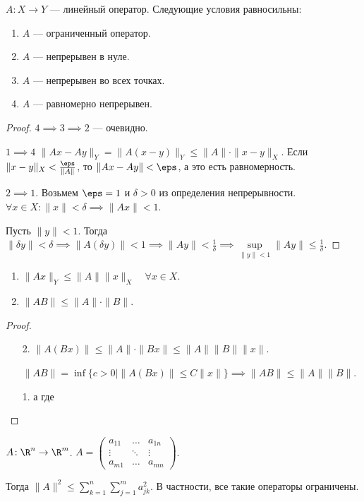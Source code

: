 \begin{theorem}
   $A\!: X \to Y$ --- линейный оператор. Следующие условия равносильны:
   \begin{enumerate}
       \item $A$ --- ограниченный оператор.
       \item  $A$ --- непрерывен в нуле.
       \item  $A$ --- непрерывен во всех точках.
       \item $A$ --- равномерно непрерывен.
   \end{enumerate}
\end{theorem}
\begin{proof}
    $4 \implies 3 \implies 2$ --- очевидно.

    $1 \implies 4$  $\|Ax - Ay\|_Y = \|A(x-y)\|_Y \le \|A\| \cdot \|x-y\|_X$. Если $\|x-y\|_X < \frac{\eps}{\|A\|}$, то $\|Ax - Ay\| < \eps$, а это есть равномерность.

    $2 \implies 1$. Возьмем  $\eps = 1$ и  $\delta > 0$ из определения непрерывности.  $\forall x \in X\!: \|x \| < \delta \implies \|Ax\| < 1$.

    Пусть $\|y\| < 1$. Тогда  $\|\delta y\| < \delta \implies \|A(\delta y)\| < 1 \implies \|Ay\| < \frac{1}{\delta} \implies \sup\limits_{\| y \| < 1} \| Ay\| \le \frac{1}{\delta}$.
\end{proof}
\begin{consequence}
    \begin{enumerate}
        \item $\|Ax\|_Y \le \| A \| \|x\|_X \quad \forall x\in X$.
        \item $\| A B \| \le \|A \| \cdot \|B\|$.
    \end{enumerate}
\end{consequence}
\begin{proof}
    \begin{enumerate}
        \item[2.] $\|A(Bx)\| \le \|A\| \cdot \|Bx\| \le \| A \| \|B\| \|x \|$.

        $\|AB\| = \inf \{c > 0 \mid \|A(Bx)\| \le C\|x\|\} \implies \| AB\| \le \|A\|\|B\|$.

    \item[1.] а где
    \end{enumerate}
\end{proof}
\begin{theorem}
    $A\!: \R^n \to \R^m$.  $A = \begin{pmatrix} a_{11} & \ldots & a_{1n} \\ \vdots & \ddots & \vdots \\ a_{m1} & \ldots & a_{mn} \end{pmatrix}$.

    Тогда $\|A\|^2 \le \sum\limits_{k=1}^n \sum\limits_{j=1}^m a_{jk}^2$. В частности, все такие операторы ограничены.
\end{theorem}
